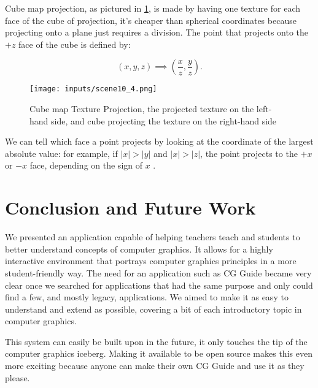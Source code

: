 \documentclass[cic,tc,english]{iiufrgs}
\begin{document}
Cube map projection, as pictured in \cref{cubemapltextureprojectiondemo}, is made by having one texture for each face of the cube of projection, it's cheaper than spherical coordinates because projecting onto a plane just requires a division. The point that projects onto the $+z$ face of the cube is defined by:

\begin{equation}
    (x,y,z) \implies  (\frac{x}{z},\frac{y}{z}).
\end{equation}

\begin{figure}[hbt!]
    \caption{Cube map Texture Projection, the projected texture on the left-hand side, and cube projecting the texture on the right-hand side}
    \begin{center}
        \texttt{[image: inputs/scene10\_4.png]}
    \end{center}
    \label{cubemapltextureprojectiondemo}
\end{figure}

We can tell which face a point projects by looking at the coordinate of the largest absolute value:  for example, if $|x| > |y|$ and $|x| > |z|$, the point projects to the $+x$ or $-x$ face, depending on the sign of $x$ \cite{Marschner2021CGFundamentals}.


\chapter{Conclusion and Future Work}
We presented an application capable of helping teachers teach and students to better understand concepts of computer graphics. It allows for a highly interactive environment that portrays computer graphics principles in a more student-friendly way. The need for an application such as CG Guide became very clear once we searched for applications that had the same purpose and only could find a few, and mostly legacy, applications. We aimed to make it as easy to understand and extend as possible, covering a bit of each introductory topic in computer graphics.

This system can easily be built upon in the future, it only touches the tip of the computer graphics iceberg. Making it available to be open source makes this even more exciting because anyone can make their own CG Guide and use it as they please.
\end{document}
